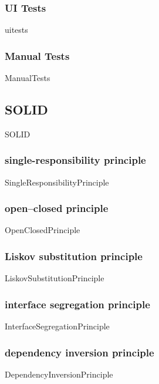 \documentclass{article}
\begin{document}
        \subsubsection{UI Tests}
            {uitests}

        \subsubsection{Manual Tests}
            {ManualTests}

    \subsection{SOLID}
        {SOLID}

        \subsubsection{single-responsibility principle}
            {SingleResponsibilityPrinciple}
        
        \subsubsection{open–closed principle}
            {OpenClosedPrinciple}
        
        \subsubsection{Liskov substitution principle}
            {LiskovSubstitutionPrinciple}
        
        \subsubsection{interface segregation principle}
            {InterfaceSegregationPrinciple}
        
        \subsubsection{dependency inversion principle}
            {DependencyInversionPrinciple}
\end{document}
